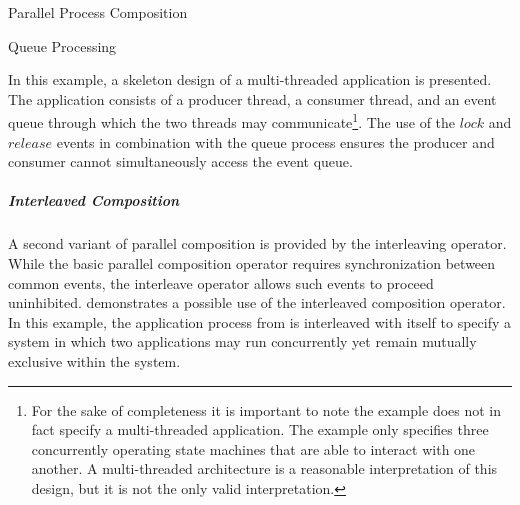 \documentclass[letterpaper,10pt,draft]{book}
\begin{document}
\begin{example}
\begin{minipage}[t]{0.49\linewidth}
   
\end{minipage}
\begin{minipage}[t]{0.49\linewidth}
   \azbox
   
\end{minipage}

   \caption{Parallel Process Composition}
   \label{ex:ParComp}
\end{example}

\begin{example}
\begin{minipage}[t]{0.49\linewidth}
   
\end{minipage}
\begin{minipage}[t]{0.49\linewidth}
   \azbox
   
\end{minipage}

   \caption{Queue Processing}
   \label{ex:IPC}
\end{example}

In this example, a skeleton design of a multi-threaded application is presented.
The application consists of a producer thread, a consumer thread, and an event queue
through which the two threads may communicate\footnote{For the sake of completeness
it is important to note the example does not in fact specify a multi-threaded application.
The example only specifies three concurrently operating state machines that are
able to interact with one another.  A multi-threaded architecture is a reasonable
interpretation of this design, but it is not the only valid interpretation.}.  The
use of the $lock$ and $release$ events in combination with the queue process ensures
the producer and consumer cannot simultaneously access the event queue.

\subparagraph{Interleaved Composition}
   \label{sect:Interleave}

A second variant of parallel composition is provided by the interleaving operator.
While the basic parallel composition operator requires synchronization between common
events, the interleave operator allows such events to proceed uninhibited.  
demonstrates a possible use of the interleaved composition operator.  In this example,
the application process from  is interleaved with itself to
specify a system in which two applications may run concurrently yet remain mutually
exclusive within the system.
\end{document}
